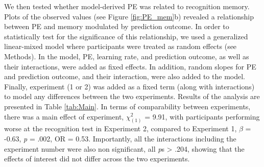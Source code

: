 \documentclass[a4paper,12pt]{article}
\begin{document}
\par
We then tested whether model-derived PE was related to recognition memory. Plots of the observed values (see Figure \ref{fig:PE_mem}b) revealed a relationship between PE and memory modulated by prediction outcome. In order to statistically test for the significance of this relationship, we used a generalized linear-mixed model where participants were treated as random effects (see Methods). In the model, PE, learning rate, and prediction outcome, as well as their interactions, were added as fixed effects. In addition, random slopes for PE and prediction outcome, and their interaction, were also added to the model. Finally, experiment (1 or 2) was added as a fixed term (along with interactions) to model any differences between the two experiments. Results of the analysis are presented in Table \ref{tab:Main}.
  In terms of comparability between experiments, there was a main effect of experiment, $\chi^2_{(1)}$ = 9.91, with participants performing worse at the recognition test in Experiment 2, compared to Experiment 1, $\beta$ = -0.63, \textit{p} = .002, OR = 0.53. Importantly, all the interactions including the experiment number were also non significant, all \textit{p}s > .204, showing that the effects of interest did not differ across the two experiments. \par
\end{document}

